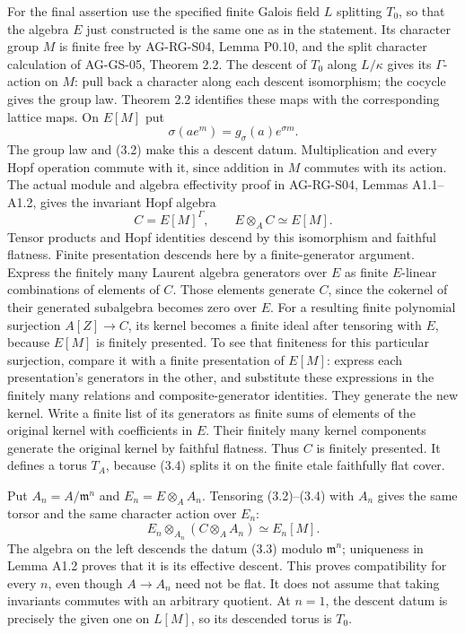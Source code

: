 \documentclass[11pt,a4paper,openany]{report}
\begin{document}
For the final assertion use the specified finite Galois field \(L\) splitting \(T_0\), so that the algebra \(E\) just constructed is the same one as in the statement. Its character group \(M\) is finite free by AG-RG-S04, Lemma P0.10, and the split character calculation of AG-GS-05, Theorem 2.2. The descent of \(T_0\) along \(L/\kappa\) gives its \(\Gamma\)-action on \(M\): pull back a character along each descent isomorphism; the cocycle gives the group law. Theorem 2.2 identifies these maps with the corresponding lattice maps. On \(E[M]\) put \[
\sigma(ae^m)=g_\sigma(a)e^{\sigma m}.
\tag{3.3}
\] The group law and (3.2) make this a descent datum. Multiplication and every Hopf operation commute with it, since addition in \(M\) commutes with its action. The actual module and algebra effectivity proof in AG-RG-S04, Lemmas A1.1--A1.2, gives the invariant Hopf algebra \[
C=E[M]^\Gamma,\qquad E\otimes_AC\simeq E[M].
\tag{3.4}
\] Tensor products and Hopf identities descend by this isomorphism and faithful flatness. Finite presentation descends here by a finite-generator argument. Express the finitely many Laurent algebra generators over \(E\) as finite \(E\)-linear combinations of elements of \(C\). Those elements generate \(C\), since the cokernel of their generated subalgebra becomes zero over \(E\). For a resulting finite polynomial surjection \(A[Z]\to C\), its kernel becomes a finite ideal after tensoring with \(E\), because \(E[M]\) is finitely presented. To see that finiteness for this particular surjection, compare it with a finite presentation of \(E[M]\): express each presentation's generators in the other, and substitute these expressions in the finitely many relations and composite-generator identities. They generate the new kernel. Write a finite list of its generators as finite sums of elements of the original kernel with coefficients in \(E\). Their finitely many kernel components generate the original kernel by faithful flatness. Thus \(C\) is finitely presented. It defines a torus \(T_A\), because (3.4) splits it on the finite etale faithfully flat cover.

Put \(A_n=A/\mathfrak m^n\) and \(E_n=E\otimes_AA_n\). Tensoring (3.2)--(3.4) with \(A_n\) gives the same torsor and the same character action over \(E_n\): \[
E_n\otimes_{A_n}(C\otimes_AA_n)\simeq E_n[M].
\tag{3.5}
\] The algebra on the left descends the datum (3.3) modulo \(\mathfrak m^n\); uniqueness in Lemma A1.2 proves that it is its effective descent. This proves compatibility for every \(n\), even though \(A\to A_n\) need not be flat. It does not assume that taking invariants commutes with an arbitrary quotient. At \(n=1\), the descent datum is precisely the given one on \(L[M]\), so its descended torus is \(T_0\).
\end{document}
